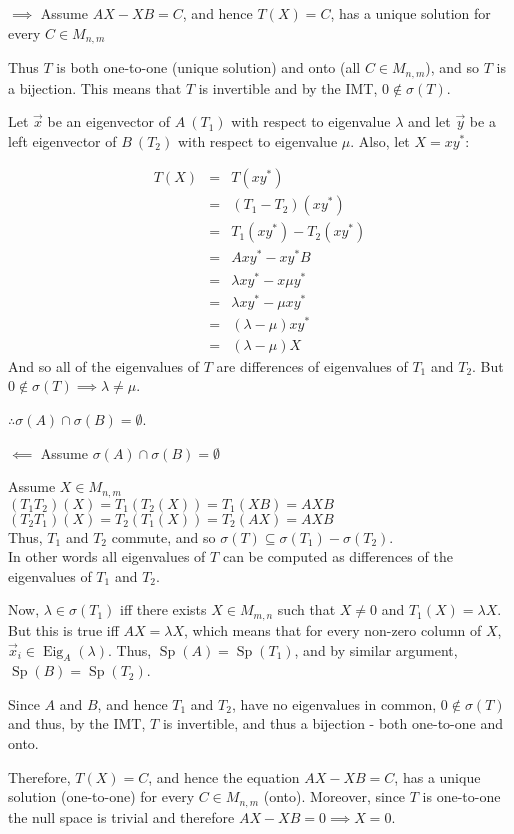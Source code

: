 \documentclass[letterpaper,12pt,fleqn]{article}
\renewcommand{\l}{\lambda}
\newcommand{\vx}{\vec{x}}
\newcommand{\vy}{\vec{y}}
\renewcommand{\o}{\sigma}
\renewcommand{\l}{\lambda}
\newcommand{\m}{\mu}
\DeclareMathOperator{\Eig}{Eig}
\DeclareMathOperator{\Sp}{Sp}
\begin{document}
\begin{description}
\item $\implies$ Assume $AX-XB=C$, and hence $T(X)=C$, has a unique solution for every
  $C\in M_{n,m}$

  Thus $T$ is both one-to-one (unique solution) and onto (all $C\in M_{n,m}$), and so
  $T$ is a bijection. This means that $T$ is invertible and by the IMT, $0\notin\o(T)$.

  Let $\vx$ be an eigenvector of $A\ (T_1)$ with respect to eigenvalue $\l$ and let $\vy$
  be a left eigenvector of $B\ (T_2)$ with respect to eigenvalue $\m$. Also, let $X=xy^*$:
  
  \begin{eqnarray*}
    T(X) &=& T(xy^*) \\
    &=& (T_1-T_2)(xy^*) \\
    &=& T_1(xy^*)-T_2(xy^*) \\
    &=& Axy^*-xy^*B \\
    &=& \l xy^*-x\m y^* \\
    &=& \l xy^*-\m xy^* \\
    &=& (\l-\m)xy^* \\
    &=& (\l-\m)X
  \end{eqnarray*}
  And so all of the eigenvalues of $T$ are differences of eigenvalues of $T_1$ and $T_2$.
  But $0\notin\o(T)\implies\l\ne\m$.

  $\therefore\o(A)\cap\o(B)=\emptyset$.
  
\item $\impliedby$ Assume $\o(A)\cap\o(B)=\emptyset$
  
  Assume $X\in M_{n,m}$ \\
  $(T_1T_2)(X)=T_1(T_2(X))=T_1(XB)=AXB$ \\
  $(T_2T_1)(X)=T_2(T_1(X))=T_2(AX)=AXB$ \\
  Thus, $T_1$ and $T_2$ commute, and so $\o(T)\subseteq\o(T_1)-\o(T_2)$. \\
  In other words all eigenvalues of $T$ can be computed as differences of the
  eigenvalues of $T_1$ and $T_2$.

  Now, $\l\in\o(T_1)$ iff there exists $X\in M_{m,n}$ such that $X\ne0$ and
  $T_1(X)=\l X$. But this is true iff $AX=\l X$, which means that for every non-zero
  column of $X$, $\vx_i\in\Eig_A(\l)$. Thus, $\Sp(A)=\Sp(T_1)$, and by similar argument,
  $\Sp(B)=\Sp(T_2)$.

  Since $A$ and $B$, and hence $T_1$ and $T_2$, have no eigenvalues in common,
  $0\notin\o(T)$ and thus, by the IMT, $T$ is invertible, and thus a bijection - both
  one-to-one and onto.

  Therefore, $T(X)=C$, and hence the equation $AX-XB=C$, has a unique solution
  (one-to-one) for every $C\in M_{n,m}$ (onto). Moreover, since $T$ is one-to-one the
  null space is trivial and therefore $AX-XB=0\implies X=0$.
\end{description}
\end{document}
